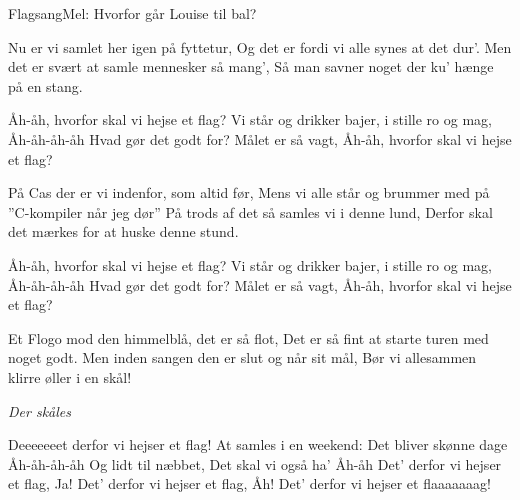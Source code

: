 \begin{sang}{Flagsang}{Mel: Hvorfor går Louise til bal?}
\begin{vers}
Nu er vi samlet her igen på fyttetur,
Og det er fordi vi alle synes at det dur'.
Men det er svært at samle mennesker så mang',
Så man savner noget der ku' hænge på en stang.
\end{vers}

\begin{omkvaed}
Åh-åh, hvorfor skal vi hejse et flag?
Vi står og drikker bajer, i stille ro og mag,
Åh-åh-åh-åh
Hvad gør det godt for?
Målet er så vagt,
Åh-åh, hvorfor skal vi hejse et flag?
\end{omkvaed}

\begin{vers}
På Cas der er vi indenfor, som altid før,
Mens vi alle står og brummer med på ''C-kompiler når jeg dør''
På trods af det så samles vi i denne lund,
Derfor skal det mærkes for at huske denne stund.
\end{vers}

\begin{omkvaed}
Åh-åh, hvorfor skal vi hejse et flag?
Vi står og drikker bajer, i stille ro og mag,
Åh-åh-åh-åh
Hvad gør det godt for?
Målet er så vagt,
Åh-åh, hvorfor skal vi hejse et flag?
\end{omkvaed}

\begin{vers}
Et Flogo mod den himmelblå, det er så flot,
Det er så fint at starte turen med noget godt.
Men inden sangen den er slut og når sit mål,
Bør vi allesammen klirre øller i en skål!
\end{vers}

\textit{Der skåles}

\begin{omkvaed}
Deeeeeeet derfor vi hejser et flag!
At samles i en weekend: Det bliver skønne dage
Åh-åh-åh-åh
Og lidt til næbbet,
Det skal vi også ha'
Åh-åh
Det' derfor vi hejser et flag, Ja!
Det' derfor vi hejser et flag, Åh!
Det' derfor vi hejser et flaaaaaaag!
\end{omkvaed}
\end{sang}
